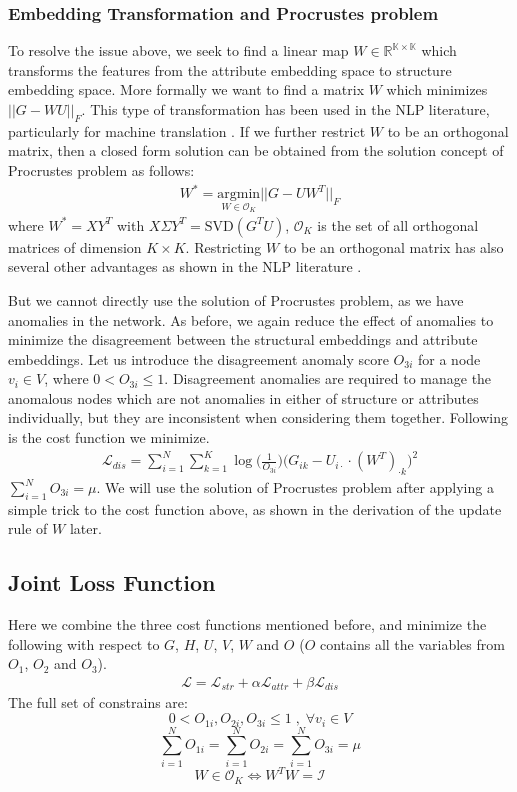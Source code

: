 \documentclass[letterpaper]{article} %
\begin{document}
\subsubsection{Embedding Transformation and Procrustes problem}
To resolve the issue above, we seek to find a linear map $W \in \mathbb{R^{K \times K}}$ which transforms the features from the attribute embedding space to structure embedding space. More formally we want to find a matrix $W$ which minimizes $||G - WU||_F$. This type of transformation has been used in the NLP literature, particularly for machine translation \cite{lample2018word}.
If we further restrict $W$ to be an orthogonal matrix, then a closed form solution can be obtained from the solution concept of Procrustes problem \cite{schonemann1966generalized} as follows:
\begin{align}\label{eq:W}
W^*
= \underset{W \in \mathcal{O}_K}{\text{argmin}} ||G - UW^T||_F
\end{align}
where $W^* = XY^T$ with $X \Sigma Y^T = \text{SVD}(G^T U)$, $\mathcal{O}_K$ is the set of all orthogonal matrices of dimension $K \times K$. Restricting $W$ to be an orthogonal matrix has also several other advantages as shown in the NLP literature \cite{xing2015normalized}.

But we cannot directly use the solution of Procrustes problem, as we have anomalies in the network.
As before, we again reduce the effect of anomalies to minimize the disagreement between the structural embeddings and attribute embeddings. Let us introduce the disagreement anomaly score $O_{3i}$ for a node $v_i \in V$, where $0 < O_{3i} \leq 1$. Disagreement anomalies are required to manage the anomalous nodes which are not anomalies in either of structure or attributes individually, but they are inconsistent when considering them together. Following is the cost function we minimize.
\begin{align}\label{eq:L3}
\mathcal{L}_{dis} = \sum\limits_{i=1}^N \sum\limits_{k=1}^K \log\Big({\frac{1}{O_{3i}}}\Big) \Big(G_{ik} - U_{i\cdot} \cdot (W^T)_{\cdot k}\Big)^2
\end{align}
$\sum\limits_{i=1}^N O_{3i}= \mu$. We will use the solution of Procrustes problem after applying a simple trick to  the cost function above, as shown in the derivation of the update rule of $W$ later.

\subsection{Joint Loss Function}
Here we combine the three cost functions mentioned before, and minimize the following with respect to $G$, $H$, $U$, $V$, $W$ and $O$ ($O$ contains all the variables from $O_1$, $O_2$ and $O_3$).
\begin{align}\label{eq:L}
\mathcal{L} = \mathcal{L}_{str} + \alpha \mathcal{L}_{attr} + \beta \mathcal{L}_{dis}
\end{align}
The full set of constrains are:
\[
0 < O_{1i}, O_{2i}, O_{3i} \leq 1 \; , \; \forall v_i \in V
\]
\[
\sum_{i=1}^{N}O_{1i} = \sum_{i=1}^{N}O_{2i} = \sum_{i=1}^{N}O_{3i} = \mu
\]
\[
W \in \mathcal{O}_{K} \iff W^{T}W = \mathcal{I}
\]
\end{document}
